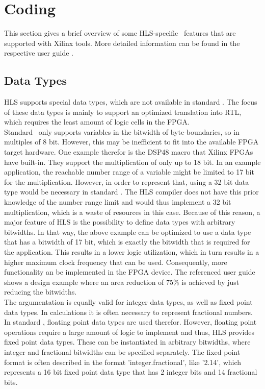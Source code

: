 \section{Coding}

This section gives a brief overview of some HLS-specific \cplusplus\ features that are supported with Xilinx tools.
More detailed information can be found in the respective user guide \cite{VivadoUgHLS}.

\subsection{Data Types}

HLS supports special data types, which are not available in standard \cplusplus.
The focus of these data types is mainly to support an optimized translation into RTL, which requires the least amount of logic cells in the FPGA.\\

Standard \cplusplus\ only supports variables in the bitwidth of byte-boundaries, so in multiples of 8 bit.
However, this may be inefficient to fit into the available FPGA target hardware.
One example therefor is the DSP48 macro that Xilinx FPGAs have built-in.
They support the multiplication of only up to 18 bit.
In an example application, the reachable number range of a variable might be limited to 17 bit for the multiplication.
However, in order to represent that, using a 32 bit data type would be necessary in standard \cplusplus.
The HLS compiler does not have this prior knowledge of the number range limit and would thus implement a 32 bit multiplication, which is a waste of resources in this case.
Because of this reason, a major feature of HLS is the possibility to define data types with arbitrary bitwidths.
In that way, the above example can be optimized to use a data type that has a bitwidth of 17 bit, which is exactly the bitwidth that is required for the application.
This results in a lower logic utilization, which in turn results in a higher maximum clock frequency that can be used.
Consequently, more functionality an be implemented in the FPGA device.
The referenced user guide shows a design example where an area reduction of 75\% is achieved by just reducing the bitwidths.\\

The argumentation is equally valid for integer data types, as well as fixed point data types.
In calculations it is often necessary to represent fractional numbers.
In standard \cplusplus, floating point data types are used therefor.
However, floating point operations require a large amount of logic to implement and thus, HLS provides fixed point data types.
These can be instantiated in arbitrary bitwidths, where integer and fractional bitwidths can be specified separately.
The fixed point format is often described in the format 'integer.fractional', like '2.14', which represents a 16 bit fixed point data type that has 2 integer bits and 14 fractional bits.\\

